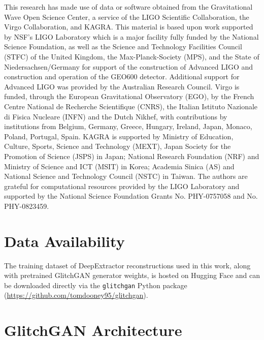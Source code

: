\documentclass[reprint,nofootinbib,amsmath,amssymb,aps,floatfix]{revtex4-2}
\begin{document}
This research has made use of data or software obtained from the Gravitational Wave Open Science Center, a service of the LIGO Scientific Collaboration, the Virgo Collaboration, and KAGRA. This material is based upon work supported by NSF's LIGO Laboratory which is a major facility fully funded by the National Science Foundation, as well as the Science and Technology Facilities Council (STFC) of the United Kingdom, the Max-Planck-Society (MPS), and the State of Niedersachsen/Germany for support of the construction of Advanced LIGO and construction and operation of the GEO600 detector. Additional support for Advanced LIGO was provided by the Australian Research Council. Virgo is funded, through the European Gravitational Observatory (EGO), by the French Centre National de Recherche Scientifique (CNRS), the Italian Istituto Nazionale di Fisica Nucleare (INFN) and the Dutch Nikhef, with contributions by institutions from Belgium, Germany, Greece, Hungary, Ireland, Japan, Monaco, Poland, Portugal, Spain. KAGRA is supported by Ministry of Education, Culture, Sports, Science and Technology (MEXT), Japan Society for the Promotion of Science (JSPS) in Japan; National Research Foundation (NRF) and Ministry of Science and ICT (MSIT) in Korea; Academia Sinica (AS) and National Science and Technology Council (NSTC) in Taiwan.
The authors are grateful for computational resources provided by the LIGO Laboratory and supported by the National Science Foundation Grants No. PHY-0757058 and No. PHY-0823459.

\vspace{-5mm}
\section*{Data Availability}

The training dataset of DeepExtractor reconstructions used in this work, along with pretrained GlitchGAN generator weights, is hosted on Hugging Face and can be downloaded directly via the \texttt{glitchgan} Python package (\url{https://github.com/tomdooney95/glitchgan}).

\vspace{-5mm}

\appendix

\section{\label{sec:cDVGAN_Architecture}GlitchGAN Architecture}
\end{document}
